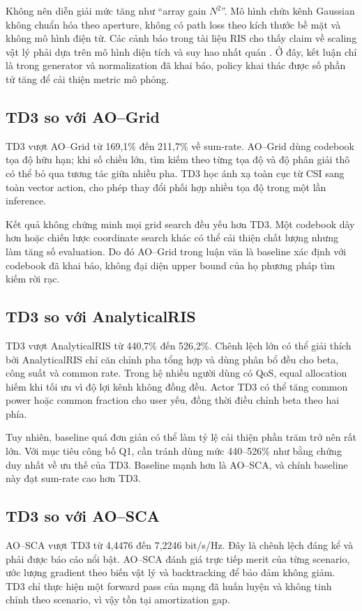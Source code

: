 Không nên diễn giải mức tăng như ``array gain $N^2$''. Mô hình chứa kênh Gaussian không chuẩn hóa theo aperture, không có path loss theo kích thước bề mặt và không mô hình điện từ. Các cảnh báo trong tài liệu RIS cho thấy claim về scaling vật lý phải dựa trên mô hình diện tích và suy hao nhất quán \cite{Bjornson2020RISMyths,DiRenzo2020SmartRadio}. Ở đây, kết luận chỉ là trong generator và normalization đã khai báo, policy khai thác được số phần tử tăng để cải thiện metric mô phỏng.

\subsection{TD3 so với AO--Grid}
TD3 vượt AO--Grid từ 169,1\% đến 211,7\% về sum-rate. AO--Grid dùng codebook tọa độ hữu hạn; khi số chiều lớn, tìm kiếm theo từng tọa độ và độ phân giải thô có thể bỏ qua tương tác giữa nhiều pha. TD3 học ánh xạ toàn cục từ CSI sang toàn vector action, cho phép thay đổi phối hợp nhiều tọa độ trong một lần inference.

Kết quả không chứng minh mọi grid search đều yếu hơn TD3. Một codebook dày hơn hoặc chiến lược coordinate search khác có thể cải thiện chất lượng nhưng làm tăng số evaluation. Do đó AO--Grid trong luận văn là baseline xác định với codebook đã khai báo, không đại diện upper bound của họ phương pháp tìm kiếm rời rạc.

\subsection{TD3 so với AnalyticalRIS}
TD3 vượt AnalyticalRIS từ 440,7\% đến 526,2\%. Chênh lệch lớn có thể giải thích bởi AnalyticalRIS chỉ căn chỉnh pha tổng hợp và dùng phân bổ đều cho beta, công suất và common rate. Trong hệ nhiều người dùng có QoS, equal allocation hiếm khi tối ưu vì độ lợi kênh không đồng đều. Actor TD3 có thể tăng common power hoặc common fraction cho user yếu, đồng thời điều chỉnh beta theo hai phía.

Tuy nhiên, baseline quá đơn giản có thể làm tỷ lệ cải thiện phần trăm trở nên rất lớn. Với mục tiêu công bố Q1, cần tránh dùng mức 440--526\% như bằng chứng duy nhất về ưu thế của TD3. Baseline mạnh hơn là AO--SCA, và chính baseline này đạt sum-rate cao hơn TD3.

\subsection{TD3 so với AO--SCA}
AO--SCA vượt TD3 từ 4,4476 đến 7,2246 bit/s/Hz. Đây là chênh lệch đáng kể và phải được báo cáo nổi bật. AO--SCA đánh giá trực tiếp merit của từng scenario, ước lượng gradient theo biến vật lý và backtracking để bảo đảm không giảm. TD3 chỉ thực hiện một forward pass của mạng đã huấn luyện và không tinh chỉnh theo scenario, vì vậy tồn tại amortization gap.


